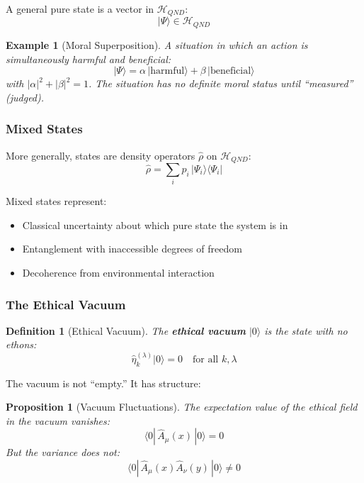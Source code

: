 \documentclass[12pt]{article}
\newtheorem{definition}{Definition}[section]
\newtheorem{proposition}{Proposition}[section]
\newtheorem{example}{Example}[section]
\begin{document}
A general pure state is a vector in $\mathcal{H}_{QND}$:
\begin{equation}
    |\Psi\rangle \in \mathcal{H}_{QND}
\end{equation}

\begin{example}[Moral Superposition]
A situation in which an action is simultaneously harmful and beneficial:
\begin{equation}
    |\Psi\rangle = \alpha \,|\text{harmful}\rangle + \beta \,|\text{beneficial}\rangle
\end{equation}
with $|\alpha|^2 + |\beta|^2 = 1$. The situation has no definite moral status until ``measured'' (judged).
\end{example}

\subsubsection{Mixed States}

More generally, states are density operators $\hat{\rho}$ on $\mathcal{H}_{QND}$:
\begin{equation}
    \hat{\rho} = \sum_i p_i \,|\Psi_i\rangle \langle \Psi_i|
\end{equation}

Mixed states represent:
\begin{itemize}
    \item Classical uncertainty about which pure state the system is in
    \item Entanglement with inaccessible degrees of freedom
    \item Decoherence from environmental interaction
\end{itemize}

\subsubsection{The Ethical Vacuum}

\begin{definition}[Ethical Vacuum]
The \textbf{ethical vacuum} $|0\rangle$ is the state with no ethons:
\begin{equation}
    \hat{\eta}_k^{(\lambda)} |0\rangle = 0 \quad \text{for all } k, \lambda
\end{equation}
\end{definition}

The vacuum is not ``empty.'' It has structure:

\begin{proposition}[Vacuum Fluctuations]
\emph{The expectation value of the ethical field in the vacuum vanishes:}
\begin{equation}
    \langle 0| \,\hat{A}_\mu(x)\, |0\rangle = 0
\end{equation}
\emph{But the variance does not:}
\begin{equation}
    \langle 0| \,\hat{A}_\mu(x) \hat{A}_\nu(y)\, |0\rangle \neq 0
\end{equation}
\end{proposition}
\end{document}
